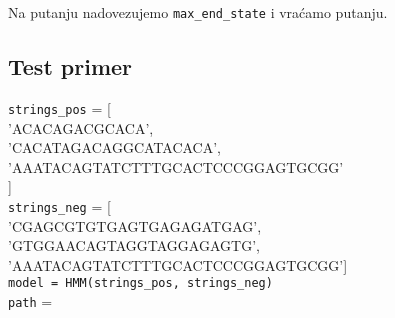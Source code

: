 Na putanju nadovezujemo \texttt{max\_end\_state} i vraćamo putanju.





\subsection{Test primer}

\noindent\texttt{strings\_pos} = [
\\\indent 'ACACAGACGCACA',
\\\indent 'CACATAGACAGGCATACACA', \\\indent 'AAATACAGTATCTTTGCACTCCCGGAGTGCGG'\\]
\\\texttt{strings\_neg} = [\\\indent 'CGAGCGTGTGAGTGAGAGATGAG', \\\indent 'GTGGAACAGTAGGTAGGAGAGTG', \\\indent 'AAATACAGTATCTTTGCACTCCCGGAGTGCGG']
\\\texttt{model = HMM(strings\_pos, strings\_neg)}
\\\texttt{path} = 